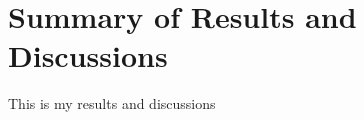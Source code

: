 \chapter{Summary of Results and Discussions}
\label{chap:results}

This is my results and discussions